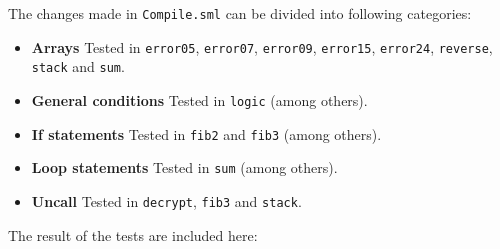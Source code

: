 \vspace{0.2cm}
The changes made in {\tt Compile.sml} can be divided into following categories:
\begin{itemize}
\item {\bf Arrays} Tested in {\tt error05}, {\tt error07}, {\tt error09},
      {\tt error15}, {\tt error24}, {\tt reverse}, {\tt stack} and {\tt sum}.
\item {\bf General conditions} Tested in {\tt logic} (among others).
\item {\bf If statements} Tested in {\tt fib2} and {\tt fib3} (among others).
\item {\bf Loop statements} Tested in {\tt sum} (among others).
\item {\bf Uncall} Tested in {\tt decrypt}, {\tt fib3} and {\tt stack}.
\end{itemize}

\clearpage
The result of the tests are included here:
{\tiny \tt

}
